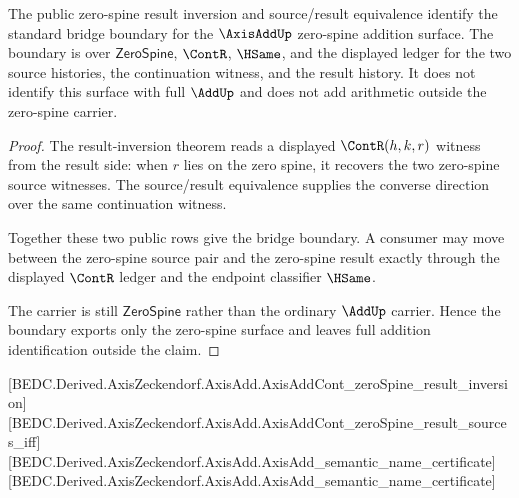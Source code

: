 \begin{theorem}
\label{thm:axisadd-zero-spine-standard-bridge-boundary}
The public zero-spine result inversion and source/result equivalence identify
the standard bridge boundary for the $\AxisAddUp$ zero-spine addition surface.
The boundary is over $\mathsf{ZeroSpine}$, $\ContR$, $\HSame$, and the displayed
ledger for the two source histories, the continuation witness, and the result
history. It does not identify this surface with full $\AddUp$ and does not add
arithmetic outside the zero-spine carrier.
\end{theorem}
\begin{proof}
The result-inversion theorem reads a displayed $\ContR(h,k,r)$ witness from the
result side: when $r$ lies on the zero spine, it recovers the two zero-spine
source witnesses. The source/result equivalence supplies the converse direction
over the same continuation witness.

Together these two public rows give the bridge boundary. A consumer may move
between the zero-spine source pair and the zero-spine result exactly through the
displayed $\ContR$ ledger and the endpoint classifier $\HSame$.

The carrier is still $\mathsf{ZeroSpine}$ rather than the ordinary $\AddUp$
carrier. Hence the boundary exports only the zero-spine surface and leaves full
addition identification outside the claim.
\end{proof}

[BEDC.Derived.AxisZeckendorf.AxisAdd.AxisAddCont\_zeroSpine\_result\_inversion]
[BEDC.Derived.AxisZeckendorf.AxisAdd.AxisAddCont\_zeroSpine\_result\_sources\_iff]
[BEDC.Derived.AxisZeckendorf.AxisAdd.AxisAdd\_semantic\_name\_certificate]
[BEDC.Derived.AxisZeckendorf.AxisAdd.AxisAdd\_semantic\_name\_certificate]

